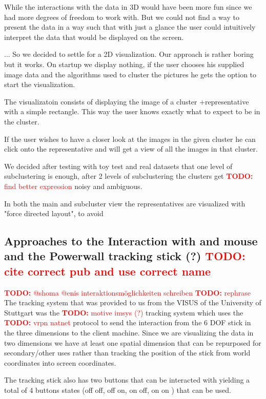 \documentclass[journal]{vgtc}       %
\newcommand{\todo}[1]{\textcolor{red}{\textbf{TODO:} #1}}
\begin{document}
While the interactions with the data in 3D would have been more fun since we had more degrees of freedom to work with.
But we could not find a way to present the data in a way such that with just a glance the user could intuitively interpret the data that would be displayed on the screen.

... So we decided to settle for a 2D visualization. Our approach is rather boring but it works. On startup we display nothing, if the user chooses his supplied image data and the algorithms used to cluster the pictures he gets the option to start the visualization.

The visualizatoin consists of displaying the image of a cluster +representative with a simple rectangle. 
This way the user knows exactly what to expect to be in the cluster.

If the user wishes to have a closer look at the images in the given cluster he can click onto the representative and will get a view of all the images in that cluster.

We decided after testing with toy test and real datasets that one level of subclustering is enough, after 2 levels of subclustering the clusters get \todo{find better expression}  noisy and ambiguous.

In both the main and subcluster view the representatives are visualized with "force directed layout", to avoid 

\subsection{Approaches to the Interaction with and mouse and the Powerwall tracking stick (?) \todo{cite correct pub and use correct name}}

\todo{@shoma @enis interaktionsmöglichkeiten schreiben}
\todo{rephrase}
The tracking system that was provided to us from the VISUS of the University of Stuttgart was the \todo{motive imsys (?)} tracking system which uses the \todo{vrpn natnet} protocol to send the interaction from the 6 DOF stick in the three dimensions to the client machine. 
Since we are visualizing the data in two dimensions we have at least one spatial dimension that can be repurposed for secondary/other uses rather than tracking the position of the stick from world coordinates into screen coordinates.

The tracking stick also has two buttons that can be interacted with yielding a total of 4 buttons states (off off, off on, on off, on on ) that can be used.
\end{document}
